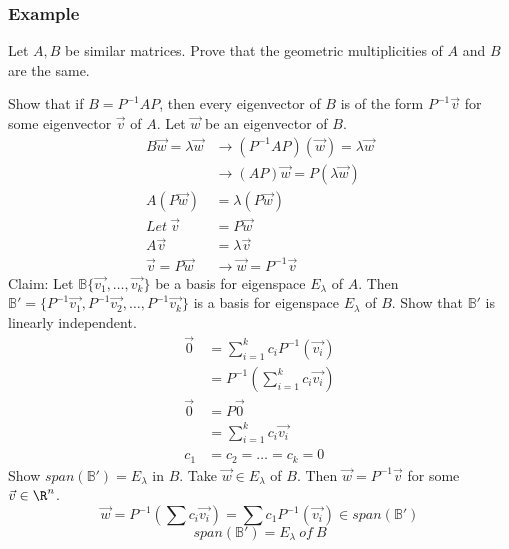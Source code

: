 \documentclass{math}
\begin{document}
\subsubsection*{Example}
Let \( A,B \) be similar matrices. Prove that the geometric multiplicities of
\( A \) and \( B \) are the same. \par
Show that if \( B = P^{-1}AP \), then every eigenvector of \( B \) is of the
form \( P^{-1}\vec{v} \) for some eigenvector \( \vec{v} \) of \( A \). Let
\( \vec{w} \) be an eigenvector of \( B \).
\begin{align*}
  B\vec{w} = \lambda\vec{w} &\to (P^{-1}AP)(\vec{w}) = \lambda\vec{w} \\
  &\to (AP)\vec{w} = P(\lambda\vec{w}) \\
  A(P\vec{w}) &= \lambda(P\vec{w}) \\
  Let~\vec{v} &= P\vec{w} \\
  A\vec{v} &= \lambda\vec{v} \\
  \vec{v} = P\vec{w} &\to \vec{w} = P^{-1}\vec{v}
\end{align*}
Claim: Let \( \mathbb{B} \{\vec{v_1},\dots,\vec{v_k}\} \) be a basis for
eigenspace \( E_{\lambda} \) of \( A \). Then \( \mathbb{B'} =
\{P^{-1}\vec{v_1},P^{-1}\vec{v_2},\dots,P^{-1}\vec{v_k}\} \) is a basis for
eigenspace \( E_{\lambda} \) of \( B \). Show that \( \mathbb{B'} \) is linearly
independent.
\begin{align*}
  \vec{0} &= \sum_{i=1}^{k}c_iP^{-1}(\vec{v_i}) \\
  &= P^{-1}(\sum_{i=1}^{k}c_i\vec{v_i}) \\
  \vec{0} &= P\vec{0} \\
  &= \sum_{i=1}^{k}c_i\vec{v_i} \\
  c_1 &= c_2 = \dots = c_k = 0
\end{align*}
Show \( span(\mathbb{B'}) = E_{\lambda} \) in \( B \). Take \( \vec{w}\in
E_{\lambda} \) of \( B \). Then \( \vec{w} = P^{-1}\vec{v} \) for some
\( \vec{v}\in\R^n \).
\[ \vec{w} = P^{-1}(\sum c_i\vec{v_i}) = \sum c_1P^{-1}(\vec{v_i})\in
  span(\mathbb{B'}) \]
\[ span(\mathbb{B'}) = E_{\lambda}~of~B \]
\end{document}

